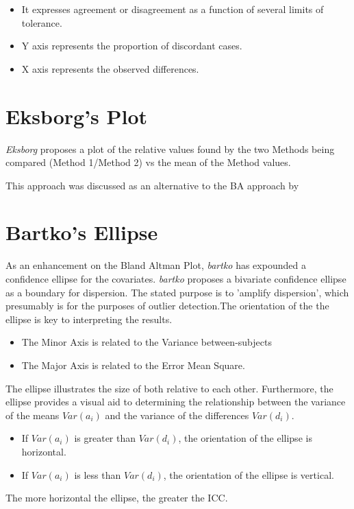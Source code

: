 \documentclass[Chap2main.tex]{subfiles}
\begin{document}
\begin{itemize}
\item It expresses agreement or disagreement as a function of several
limits of tolerance.
\item Y axis represents the proportion of discordant cases.
\item X axis represents the observed differences.
\end{itemize}

\section{Eksborg's Plot}
\textit{Eksborg} proposes a plot of the relative values found by the two
Methods being compared (Method 1/Method 2) vs the mean of the Method
values.

This approach was discussed as an alternative to the BA approach by 
\newpage
\section{Bartko's Ellipse}
As an enhancement on the Bland Altman Plot, \textit{bartko} has
expounded a confidence ellipse for the covariates. \textit{bartko} proposes
a bivariate confidence ellipse as a boundary for dispersion. The stated purpose is to 'amplify dispersion', which presumably is for  the purposes of outlier detection.The orientation of the the ellipse is key to interpreting the results.
\begin{itemize}
 \item The Minor Axis is related to the Variance between-subjects
 \item The Major Axis is related to the Error Mean Square.
\end{itemize}
The ellipse illustrates the size of both relative to each
other. Furthermore, the ellipse provides a visual aid to determining the relationship
between the variance of the means $Var(a_{i})$ and the variance of the differences $Var(d_{i})$.
\begin{itemize}
 \item If $Var(a_{i})$ is greater than $Var(d_{i})$, the orientation of the ellipse is horizontal.
 \item If $Var(a_{i})$ is less than $Var(d_{i})$, the orientation of the ellipse is vertical.
\end{itemize}
The more horizontal the ellipse, the greater the ICC.

\newpage
\end{document}
